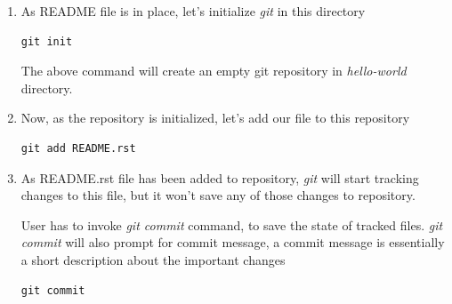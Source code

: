 \documentclass[letterpaper,10pt,english]{sphinxmanual}
\begin{document}
\begin{enumerate}
\item {} 
As README file is in place, let's initialize \emph{git} in this directory

\begin{Verbatim}[commandchars=\\\{\}]
git init
\end{Verbatim}

The above command will create an empty git repository in \emph{hello-world}
directory.

\item {} 
Now, as the repository is initialized, let's add our file to this
repository

\begin{Verbatim}[commandchars=\\\{\}]
git add README.rst
\end{Verbatim}

\item {} 
As README.rst file has been added to repository, \emph{git} will start
tracking changes to this file, but it won't save any of those changes
to repository.

User has to invoke \emph{git commit} command, to save the state of tracked files.
\emph{git commit} will also prompt for commit message, a commit message is
essentially a short description about the important changes

\begin{Verbatim}[commandchars=\\\{\}]
git commit
\end{Verbatim}

\end{enumerate}
\end{document}
